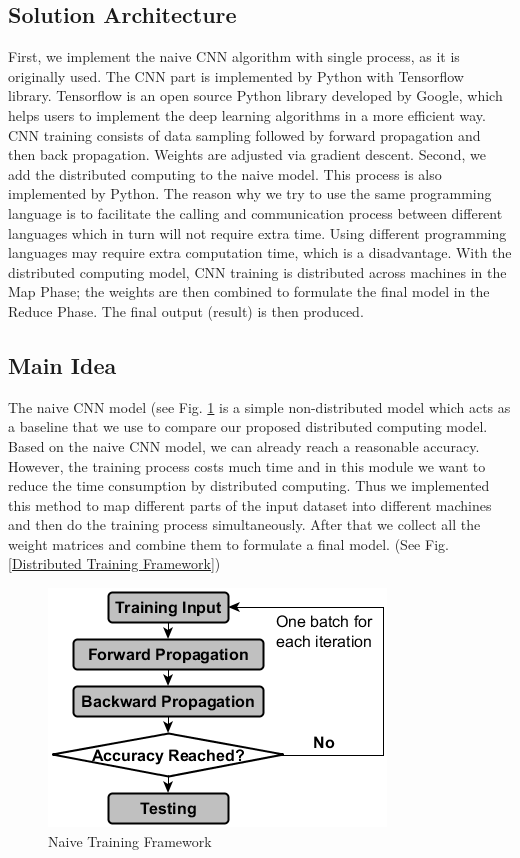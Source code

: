 \subsection{Solution Architecture}
First, we implement the naive CNN algorithm with single process, as it is originally used. The CNN part is implemented by Python with Tensorflow library. Tensorflow is an open source Python library developed by Google, which helps users to implement the deep learning algorithms in a more efficient way. CNN training consists of data sampling followed by forward propagation and then back propagation. Weights are adjusted via gradient descent. 
Second, we add the distributed computing to the naive model. This process is also implemented by Python. The reason why we try to use the same programming language is to facilitate the calling and communication process between different languages which in turn will not require extra time. Using different programming languages may require extra computation time, which is a disadvantage. With the distributed computing model, CNN training is distributed across machines in the Map Phase; the weights are then combined to formulate the final model in the Reduce Phase. The final output (result) is then produced. 


\subsection{Main Idea}
\label{MainIdea}
The naive CNN model (see Fig. \ref{Naive Training Framework} is a simple non-distributed model which acts as a baseline that we use to compare our proposed distributed computing model.
Based on the naive CNN model, we can already reach a reasonable accuracy. However, the training process costs much time and in this module we want to reduce the time consumption by distributed computing. Thus we implemented this method to map different parts of the input dataset into different machines and then do the training process simultaneously. After that we collect all the weight matrices and combine them to formulate a final model. (See Fig. \ref{Distributed Training Framework})

\begin {figure}[t]
\centering
\includegraphics[width=0.7\columnwidth]{Paper_Fig5_NaiveTrainingFramework.png} %
\caption{Naive Training Framework}
\label{Naive Training Framework}
\end {figure}


